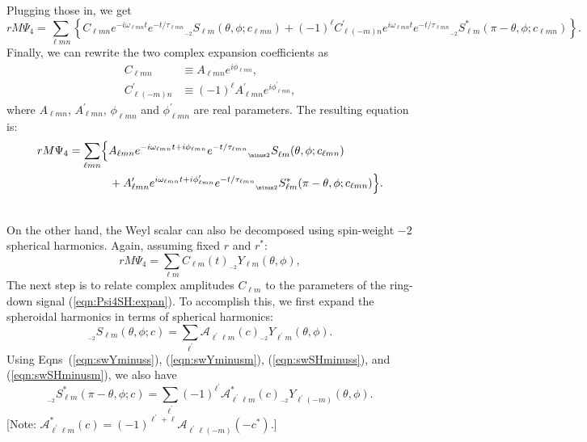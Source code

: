 \documentclass[11pt]{article}
\newcommand{\swY}[4][]{{}_{{}_{#2}}\!Y^{#1}_{#3}(#4)}
\newcommand{\swSH}[5][]{{}_{{}_{#2}}S^{#1}_{#3}(#4;#5)}
\newcommand{\YSH}[3][]{\mathcal{A}^{#1}_{#2}(#3)}
\begin{document}
\noindent
Plugging those in, we get
\begin{equation}
\nonumber rM\Psi_4 = \sum_{\ell{m}n} \left\{C_{\ell{m}n} e^{-i\omega_{\ell{m}n}t}e^{-t/\tau_{\ell{m}n}} \swSH{\minus 2}{\ell{m}}{\theta,\phi}{c_{\ell{m}n}}
  + (-1)^\ell C^\prime_{\ell(-m)n} e^{i\omega_{\ell{m}n}t}e^{-t/\tau_{\ell{m}n}} \swSH[*]{\minus 2}{\ell{m}}{\pi-\theta,\phi}{c_{\ell{m}n}} \right\}.
\end{equation}
Finally, we can rewrite the two complex expansion coefficients as
\begin{align}
  C_{\ell{m}n} &\equiv A_{\ell{m}n}e^{i\phi_{\ell{m}n}}, \\
  C^\prime_{\ell(-m)n} &\equiv (-1)^\ell A^\prime_{\ell{m}n}e^{i\phi^\prime_{\ell{m}n}},
\end{align}
where $A_{\ell{m}n}$, $A^\prime_{\ell{m}n}$, $\phi_{\ell{m}n}$ and $\phi^\prime_{\ell{m}n}$ are real parameters.  The resulting equation is:
\begin{align} \label{eqn:Psi4SH:expan}
\nonumber rM\Psi_4 &= \sum_{\ell{m}n} \Bigl\{A_{\ell{m}n} e^{-i\omega_{\ell{m}n}t+i\phi_{\ell{m}n}}e^{-t/\tau_{\ell{m}n}} \swSH{\minus 2}{\ell{m}}{\theta,\phi}{c_{\ell{m}n}} \nonumber\\ & {} \hspace{0.5in}
  + A^\prime_{\ell{m}n} e^{i\omega_{\ell{m}n}t+i\phi^\prime_{\ell{m}n}}e^{-t/\tau_{\ell{m}n}} \swSH[*]{\minus 2}{\ell{m}}{\pi-\theta,\phi}{c_{\ell{m}n}} \Bigr\}.
\end{align}

\noindent\\
On the other hand, the Weyl scalar can also be decomposed using spin-weight $\minus 2$ spherical harmonics.  Again, assuming fixed $r$ and $r^*$:
\begin{equation}\label{eqn:Psi4Y:expan}
rM\Psi_4 = \sum_{\ell{m}} C_{\ell{m}}(t) \swY{\minus 2}{\ell{m}}{\theta,\phi},
\end{equation} 
The next step is to relate complex amplitudes $C_{\ell{m}}$ to the parameters of the ring-down signal (\ref{eqn:Psi4SH:expan}).  To accomplish this, we first expand the spheroidal harmonics in terms of spherical harmonics:
\begin{equation} \label{eqn:swSH:expan}
\swSH{\minus 2}{\ell{m}}{\theta,\phi}{c} = \sum_{\ell^\prime} \YSH{\ell^\prime\ell{m}}{c} \swY{\minus 2}{\ell^\prime{m}}{\theta,\phi}.
\end{equation}
Using Eqns~(\ref{eqn:swYminuss}), (\ref{eqn:swYminusm}), (\ref{eqn:swSHminuss}), and (\ref{eqn:swSHminusm}), we also have
\begin{equation} \label{eqn:swSconj:expan}
\swSH[*]{\minus 2}{\ell{m}}{\pi-\theta,\phi}{c} = \sum_{\ell^\prime} (-1)^{\ell^\prime}\YSH[*]{\ell^\prime\ell{m}}{c} \swY{\minus 2}{\ell^\prime(-m)}{\theta,\phi}.
\end{equation}
[Note: $\YSH[*]{\ell^\prime\ell{m}}{c} = (-1)^{\ell^\prime+\ell}\YSH{\ell^\prime\ell(-m)}{-c^*}$.]
\end{document}
